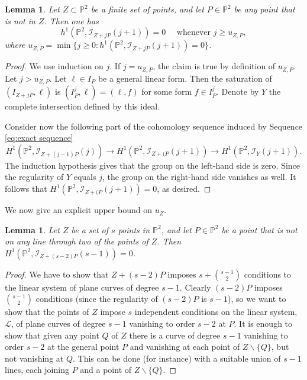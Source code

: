 \documentclass[12pt]{amsart}
\numberwithin{equation}{section}
\newtheorem{lemma}[theorem]{Lemma}
\theoremstyle{definition}
\begin{document}
\begin{lemma}
   \label{cor:uZ implies}
Let $Z \subset { \ensuremath{\mathbb{P}}}^2$ be a finite set of points, and let $P \in { \ensuremath{\mathbb{P}}}^2$  be any point that is not in $Z$. Then  one has   
\[
 h^1({ \ensuremath{\mathbb{P}}}^2,\mathcal I_{Z+jP}(j+1))=0 \quad \text{ whenever } j \ge u_{Z, P},   
\]
where $u_{Z, P}  =  \min \{ j \geq 0 :  h^1({ \ensuremath{\mathbb{P}}}^2,\mathcal I_{Z+jP}(j+1))=0 \}$. 
\end{lemma} 

\begin{proof}
We use induction on $j$. If $j = u_{Z, P}$, the claim is true by definition of $u_{Z, P}$. Let $j > u_{Z, P}$. 
Let $\ell \in I_P$ be a general linear form. Then the saturation of $(I_{Z + jP}, \ell)$ is 
$(I_P^j, \ell) = (\ell, f)$ for some form $f \in I_P^j$. Denote by $Y$ the complete intersection defined by this ideal. 

Consider now the following part of the cohomology sequence induced by Sequence \eqref{eq:exact sequence}
\[
H^1 ({ \ensuremath{\mathbb{P}}}^2,\mathcal I_{Z+(j-1)P}(j)) \to H^1 ({ \ensuremath{\mathbb{P}}}^2,\mathcal I_{Z+(P}(j+1)) \to  H^1 ({ \ensuremath{\mathbb{P}}}^2,\mathcal I_Y (j+1)). 
\] 
The induction hypothesis gives that the group on the left-hand side is zero. Since the regularity of $Y$ equals $j$, the group on the right-hand side vanishes as well. It follows that $H^1 ({ \ensuremath{\mathbb{P}}}^2,\mathcal I_{Z+(P}(j+1)) = 0$, as desired. 
\end{proof} 

We now give an explicit upper bound on $u_{Z}$. 

\begin{lemma}
   \label{lem:uZ estimate}
Let $Z$ be a set of $s$ points in ${ \ensuremath{\mathbb{P}}}^2$, and let $P \in { \ensuremath{\mathbb{P}}}^2$ be a point that is not on any line through two of the points of $Z$.     Then $H^1({ \ensuremath{\mathbb{P}}}^2,\mathcal I_{Z+(s-2)P}(s-1)) = 0$. 
\end{lemma}

\begin{proof} 
We have to show that $Z + (s-2)P$ imposes $s + \binom{s-1}{2}$ conditions to the linear system of plane curves of degree $s-1$. Clearly $(s-2)P$ imposes $\binom{s-1}{2}$ conditions (since the regularity of $(s-2)P$ is $s-1$), so we want to show that the points of $Z$ impose $s$ independent conditions on the linear system, $\mathcal L$, of plane curves of degree $s-1$ vanishing to order $s-2$ at $P$. It is enough to show that given any point $Q$ of $Z$ there is a curve of degree $s-1$ vanishing to order $s-2$ at the general point $P$ and vanishing at each point of $Z \backslash \{Q\}$, but not vanishing at $Q$. This can be done (for instance) with a suitable union of $s-1$ lines, each joining $P$ and a point of $Z \backslash \{Q\}$.
\end{proof}
\end{document}
